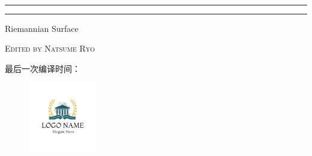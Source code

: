 \begin{titlepage}
\vspace{0.75\baselineskip} %

{\huge {}\\} %

\vspace{0.75\baselineskip} %

\rule{\textwidth}{0.4pt}\vspace*{-\baselineskip}\vspace{3.2pt} %
\rule{\textwidth}{1.6pt} %

\vspace{2\baselineskip} %


\Huge{Riemannian Surface} 

\vspace*{3\baselineskip} %



\vspace{0.5\baselineskip} 

{\scshape   \LARGE Edited by Natsume Ryo} %
\vspace{0.2\baselineskip} 


\vfill 
\Large{最后一次编译时间：\DTMnow}

\begin{figure}[!h]
    \centering
    \includegraphics[width = 3cm, height= 3cm]{resource/icon.png}%
\end{figure}
\vspace{0.3\baselineskip} 

\end{titlepage}